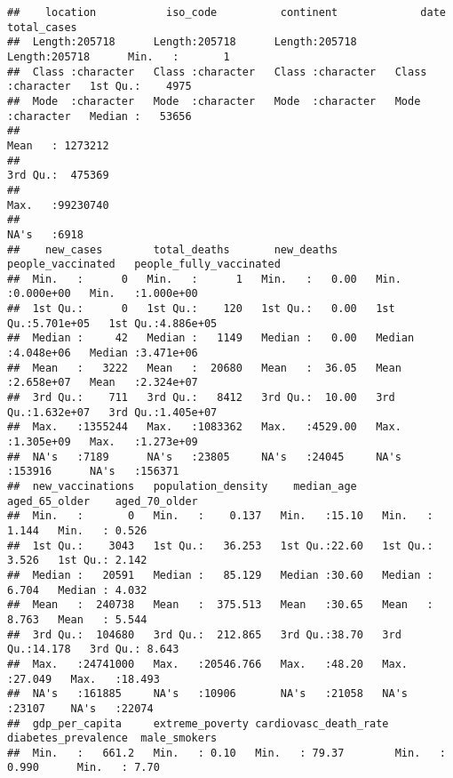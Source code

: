 \documentclass[
]{article}
\begin{document}
\begin{verbatim}
##    location           iso_code          continent             date            total_cases      
##  Length:205718      Length:205718      Length:205718      Length:205718      Min.   :       1  
##  Class :character   Class :character   Class :character   Class :character   1st Qu.:    4975  
##  Mode  :character   Mode  :character   Mode  :character   Mode  :character   Median :   53656  
##                                                                              Mean   : 1273212  
##                                                                              3rd Qu.:  475369  
##                                                                              Max.   :99230740  
##                                                                              NA's   :6918      
##    new_cases        total_deaths       new_deaths      people_vaccinated   people_fully_vaccinated
##  Min.   :      0   Min.   :      1   Min.   :   0.00   Min.   :0.000e+00   Min.   :1.000e+00      
##  1st Qu.:      0   1st Qu.:    120   1st Qu.:   0.00   1st Qu.:5.701e+05   1st Qu.:4.886e+05      
##  Median :     42   Median :   1149   Median :   0.00   Median :4.048e+06   Median :3.471e+06      
##  Mean   :   3222   Mean   :  20680   Mean   :  36.05   Mean   :2.658e+07   Mean   :2.324e+07      
##  3rd Qu.:    711   3rd Qu.:   8412   3rd Qu.:  10.00   3rd Qu.:1.632e+07   3rd Qu.:1.405e+07      
##  Max.   :1355244   Max.   :1083362   Max.   :4529.00   Max.   :1.305e+09   Max.   :1.273e+09      
##  NA's   :7189      NA's   :23805     NA's   :24045     NA's   :153916      NA's   :156371         
##  new_vaccinations   population_density    median_age    aged_65_older    aged_70_older   
##  Min.   :       0   Min.   :    0.137   Min.   :15.10   Min.   : 1.144   Min.   : 0.526  
##  1st Qu.:    3043   1st Qu.:   36.253   1st Qu.:22.60   1st Qu.: 3.526   1st Qu.: 2.142  
##  Median :   20591   Median :   85.129   Median :30.60   Median : 6.704   Median : 4.032  
##  Mean   :  240738   Mean   :  375.513   Mean   :30.65   Mean   : 8.763   Mean   : 5.544  
##  3rd Qu.:  104680   3rd Qu.:  212.865   3rd Qu.:38.70   3rd Qu.:14.178   3rd Qu.: 8.643  
##  Max.   :24741000   Max.   :20546.766   Max.   :48.20   Max.   :27.049   Max.   :18.493  
##  NA's   :161885     NA's   :10906       NA's   :21058   NA's   :23107    NA's   :22074   
##  gdp_per_capita     extreme_poverty cardiovasc_death_rate diabetes_prevalence  male_smokers  
##  Min.   :   661.2   Min.   : 0.10   Min.   : 79.37        Min.   : 0.990      Min.   : 7.70  

\end{verbatim}
\end{document}

